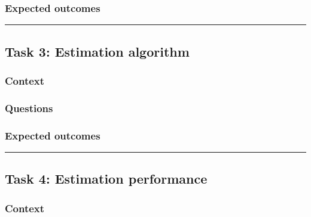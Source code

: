 \documentclass[]{book}
\theoremstyle{definition}
\theoremstyle{definition}
\theoremstyle{definition}
\theoremstyle{remark}
\begin{document}
\hypertarget{expected-outcomes-9}{%
\subsubsection*{Expected outcomes}\label{expected-outcomes-9}}

\begin{center}\rule{0.5\linewidth}{\linethickness}\end{center}

\hypertarget{task-3-estimation-algorithm}{%
\subsection*{Task 3: Estimation
algorithm}\label{task-3-estimation-algorithm}}

\hypertarget{context-11}{%
\subsubsection*{Context}\label{context-11}}

\hypertarget{questions-10}{%
\subsubsection*{Questions}\label{questions-10}}

\hypertarget{expected-outcomes-10}{%
\subsubsection*{Expected outcomes}\label{expected-outcomes-10}}

\begin{center}\rule{0.5\linewidth}{\linethickness}\end{center}

\hypertarget{task-4-estimation-performance}{%
\subsection*{Task 4: Estimation
performance}\label{task-4-estimation-performance}}

\hypertarget{context-12}{%
\subsubsection*{Context}\label{context-12}}
\end{document}
